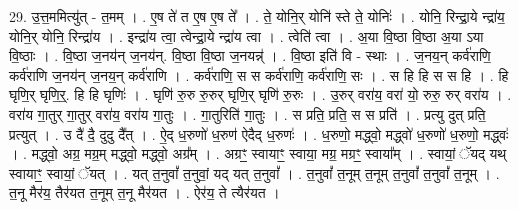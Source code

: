 \documentclass[17pt]{extarticle}
\begin{document}
29. उ॒त्त॒ममित्यु॑त् - त॒मम् । . ए॒ष ते॑ त ए॒ष ए॒ष ते᳚ । . ते॒ योनि॒र् योनि॑ स्ते ते॒ योनिः॑ । . योनि॒ रिन्द्रा॒ये न्द्रा॑य॒ योनि॒र् योनि॒ रिन्द्रा॑य । . इन्द्रा॑य त्वा॒ त्वेन्द्रा॒ये न्द्रा॑य त्वा । . त्वेति॑ त्वा । . अ॒या वि॒ष्ठा वि॒ष्ठा अ॒या ऽया वि॒ष्ठाः । . वि॒ष्ठा ज॒नय॑न् ज॒नय॑न्. वि॒ष्ठा वि॒ष्ठा ज॒नयन्न्॑ । . वि॒ष्ठा इति॑ वि - स्थाः । . ज॒नय॒न् कर्व॑राणि॒ कर्व॑राणि ज॒नय॑न् ज॒नय॒न् कर्व॑राणि । . कर्व॑राणि॒ स स कर्व॑राणि॒ कर्व॑राणि॒ सः । . स हि हि स स हि । . हि घृणि॒र् घृणि॒र्॒. हि हि घृणिः॑ । . घृणि॑ रु॒रु रु॒रुर् घृणि॒र् घृणि॑ रु॒रुः । . उ॒रुर् वरा॑य॒ वरा॑ यो॒ रुरु॒ रुर् वरा॑य । . वरा॑य गा॒तुर् गा॒तुर् वरा॑य॒ वरा॑य गा॒तुः । . गा॒तुरिति॑ गा॒तुः । . स प्रति॒ प्रति॒ स स प्रति॑ । . प्रत्यु दुत् प्रति॒ प्रत्युत् । . उ दै॑ दै॒ दुदु दै᳚त् । . ऐ॒द् ध॒रुणो॑ ध॒रुण॑ ऐदैद् ध॒रुणः॑ । . ध॒रुणो॒ मद्ध्वो॒ मद्ध्वो॑ ध॒रुणो॑ ध॒रुणो॒ मद्ध्वः॑ । . मद्ध्वो॒ अग्र॒ मग्र॒म् मद्ध्वो॒ मद्ध्वो॒ अग्र᳚म् । . अग्रꣳ॒॒ स्वायाꣳ॒॒ स्वाया॒ मग्र॒ मग्रꣳ॒॒ स्वाया᳚म् । . स्वायां॒ ॅयद् यथ् स्वायाꣳ॒॒ स्वायां॒ ॅयत् । . यत् त॒नुवां᳚ त॒नुवां॒ यद् यत् त॒नुवां᳚ । . त॒नुवां᳚ त॒नूम् त॒नूम् त॒नुवां᳚ त॒नुवां᳚ त॒नूम् । . त॒नू मैर॑य॒ तैर॑यत त॒नूम् त॒नू मैर॑यत । . ऐर॑य॒ ते त्यैर॑यत । \newline
\end{document}
